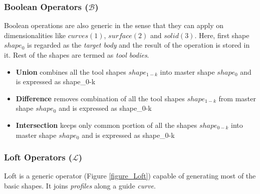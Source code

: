 \subsubsection{Boolean Operators ($\mathcal{B}$)}

Boolean operations are also generic in the sense that they can apply on dimensionalities like $curves(1)$, $surface(2)$ and $solid(3)$.  Here, first shape $shape_0$ is regarded as the {\em target body} and the result of the operation is stored in it. Rest of the shapes are termed as {\em tool bodies}.

\begin{itemize}[noitemsep,topsep=2pt,parsep=2pt,partopsep=2pt,label={},leftmargin=*]
\item {\bf Union} combines all the tool shapes ${shape_{1-k}}$ into master shape $shape_0$ and is expressed as	 {shape_{0-k}} 	
\item {\bf Difference} removes combination of all the tool shapes ${shape_{1-k}}$ from master shape $shape_0$ and is expressed as	 {shape_{0-k}}  
\item {\bf Intersection} keeps only common portion of all the shapes ${shape_{0-k}}$ into master shape $shape_0$ and is expressed as	 {shape_{0-k}} 	 
\end{itemize}


\subsubsection{Loft Operators ($\mathcal{L}$)}

Loft is a generic operator (Figure \ref{figure_Loft})  capable of generating most of the basic shapes. It joins {\em profiles} along a guide {\em curve}. 

